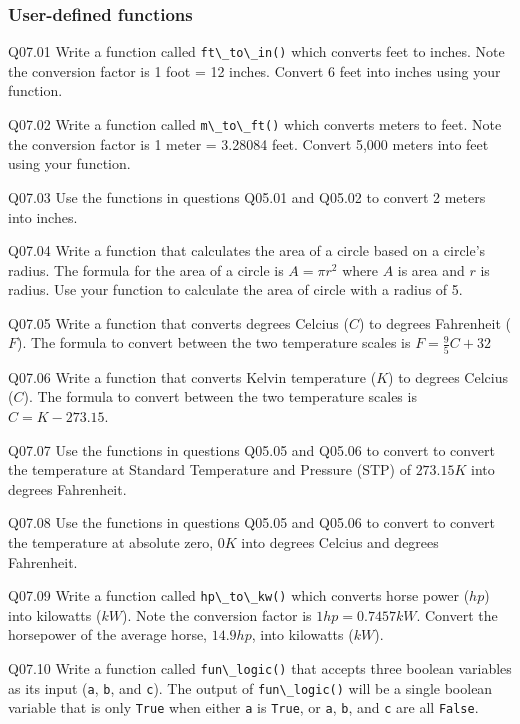 \documentclass{book}
\newenvironment{problems}{}{}  %
\newcommand{\passthrough}[1]{#1}
\begin{document}
    
        \begin{problems}
        \hypertarget{user-defined-functions}{%
\subsubsection{User-defined functions}\label{user-defined-functions}}

Q07.01 Write a function called \passthrough{\lstinline!ft\_to\_in()!}
which converts feet to inches. Note the conversion factor is 1 foot = 12
inches. Convert 6 feet into inches using your function.

Q07.02 Write a function called \passthrough{\lstinline!m\_to\_ft()!}
which converts meters to feet. Note the conversion factor is 1 meter =
3.28084 feet. Convert 5,000 meters into feet using your function.

Q07.03 Use the functions in questions Q05.01 and Q05.02 to convert 2
meters into inches.

Q07.04 Write a function that calculates the area of a circle based on a
circle's radius. The formula for the area of a circle is \(A = \pi r^2\)
where \(A\) is area and \(r\) is radius. Use your function to calculate
the area of circle with a radius of 5.

Q07.05 Write a function that converts degrees Celcius (\(C\)) to degrees
Fahrenheit (\(F\)). The formula to convert between the two temperature
scales is \(F = \frac{9}{5} C + 32\)

Q07.06 Write a function that converts Kelvin temperature (\(K\)) to
degrees Celcius (\(C\)). The formula to convert between the two
temperature scales is \(C = K - 273.15\).

Q07.07 Use the functions in questions Q05.05 and Q05.06 to convert to
convert the temperature at Standard Temperature and Pressure (STP) of
\(273.15 K\) into degrees Fahrenheit.

Q07.08 Use the functions in questions Q05.05 and Q05.06 to convert to
convert the temperature at absolute zero, \(0 K\) into degrees Celcius
and degrees Fahrenheit.

Q07.09 Write a function called \passthrough{\lstinline!hp\_to\_kw()!}
which converts horse power (\(hp\)) into kilowatts (\(kW\)). Note the
conversion factor is \(1 hp = 0.7457 kW\). Convert the horsepower of the
average horse, \(14.9 hp\), into kilowatts (\(kW\)).

Q07.10 Write a function called \passthrough{\lstinline!fun\_logic()!}
that accepts three boolean variables as its input
(\passthrough{\lstinline!a!}, \passthrough{\lstinline!b!}, and
\passthrough{\lstinline!c!}). The output of
\passthrough{\lstinline!fun\_logic()!} will be a single boolean variable
that is only \passthrough{\lstinline!True!} when either
\passthrough{\lstinline!a!} is \passthrough{\lstinline!True!}, or
\passthrough{\lstinline!a!}, \passthrough{\lstinline!b!}, and
\passthrough{\lstinline!c!} are all \passthrough{\lstinline!False!}.


\end{problems}
\end{document}
